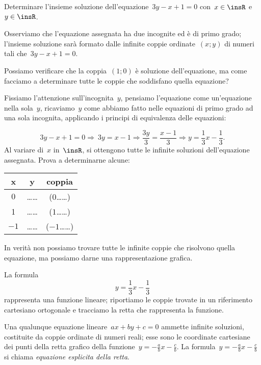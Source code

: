 \begin{exrig}\vspace{1.10ex}
 \begin{esempio}
Determinare l'insieme soluzione dell'equazione~$3y-x+1=0$ con~$x\in\insR$ 
e~$y\in\insR$.
 \end{esempio}
Osserviamo che l'equazione assegnata ha due incognite ed
è di primo grado; l'insieme soluzione sarà formato
dalle infinite coppie ordinate~$(x;y)$ di numeri tali che~$3y-x+1=0$.

Possiamo verificare che la coppia~$(1;0)$ è soluzione
dell'equazione, ma come facciamo a determinare tutte le
coppie che soddisfano quella equazione?

Fissiamo l'attenzione sull'incognita~$y$,
pensiamo l'equazione come un'equazione
nella sola~$y$, ricaviamo~$y$ come abbiamo fatto nelle equazioni di primo
grado ad una sola incognita, applicando i principi di equivalenza delle
equazioni:

\begin{equation*}
3y-x+1=0\Rightarrow~3y=x-1\Rightarrow\frac{3y}{3}=\frac{x-1}{3}\Rightarrow 
y=\frac{1}{3}x-\frac{1}{3}.
\end{equation*}
Al variare di~$x$ in~$\insR$, si ottengono tutte le infinite
soluzioni dell'equazione assegnata.
Prova a determinarne alcune:
\begin{center}
 \begin{tabular}{ccc}
\toprule
x & y & coppia\\
\midrule
$0$ &\ldots\ldots & ($0$\ldots\ldots)\\
1& \ldots\ldots &($1$\ldots\ldots)\\
$-1$ & \ldots\ldots & ($-1$\ldots\ldots)\\
\bottomrule
\end{tabular}
\end{center}

In verità non possiamo trovare tutte le infinite coppie che risolvono
quella equazione, ma possiamo darne una rappresentazione grafica.

\begin{wrapfigure}{o}{0pt}
 
\end{wrapfigure}

La formula \[y=\frac{1}{3}x-\frac{1}{3}\] rappresenta una funzione
lineare; riportiamo le coppie trovate in un riferimento cartesiano
ortogonale e tracciamo la retta che rappresenta la funzione.

Una qualunque equazione lineare~$ax+by+c=0$ ammette infinite
soluzioni, costituite da coppie ordinate di numeri reali; esse sono le
coordinate cartesiane dei punti della retta grafico della 
funzione~$y=-{\frac{a}{b}}x-\frac{c}{b}$.
La formula~$y=-{\frac{a}{b}}x-\frac{c}{b}$ si chiama \emph{equazione esplicita 
della retta}.


\end{exrig}

